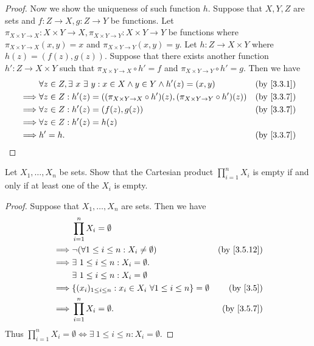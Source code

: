 \begin{proof}
  Now we show the uniqueness of such function \(h\).
  Suppose that \(X, Y, Z\) are sets and \(f : Z \to X, g : Z \to Y\) be functions.
  Let \(\pi_{X \times Y \to X} : X \times Y \to X, \pi_{X \times Y \to Y} : X \times Y \to Y\) be functions where \(\pi_{X \times Y \to X}(x, y) = x\) and \(\pi_{X \times Y \to Y}(x, y) = y\).
  Let \(h : Z \to X \times Y\) where \(h(z) = (f(z), g(z))\).
  Suppose that there exists another function \(h' : Z \to X \times Y\) such that \(\pi_{X \times Y \to X} \circ h' = f\) and \(\pi_{X \times Y \to Y} \circ h' = g\).
  Then we have
  \begin{align*}
             & \forall z \in Z, \exists\ x \ \exists\ y : x \in X \land y \in Y \land h'(z) = (x, y)                  & \text{(by \cref{3.3.1})} \\
    \implies & \forall z \in Z : h'(z) = ((\pi_{X \times Y \to X} \circ h')(z), (\pi_{X \times Y \to Y} \circ h')(z)) & \text{(by \cref{3.3.7})} \\
    \implies & \forall z \in Z : h'(z) = (f(z), g(z))                                                                 & \text{(by \cref{3.3.7})} \\
    \implies & \forall z \in Z : h'(z) = h(z)                                                                                                    \\
    \implies & h' = h.                                                                                                & \text{(by \cref{3.3.7})}
  \end{align*}
\end{proof}

\begin{ex}\label{ex:3.5.8}
  Let \(X_1, \dots, X_n\) be sets.
  Show that the Cartesian product \(\prod_{i = 1}^n X_i\) is empty if and only if at least one of the \(X_i\) is empty.
\end{ex}

\begin{proof}
  Suppose that \(X_1, \dots, X_n\) are sets.
  Then we have
  \begin{align*}
             & \prod_{i = 1}^n X_i = \emptyset                                                                             \\
    \implies & \lnot (\forall 1 \leq i \leq n : X_i \neq \emptyset)                            & \text{(by \cref{3.5.12})} \\
    \implies & \exists\ 1 \leq i \leq n : X_i = \emptyset.                                                                 \\
             & \exists\ 1 \leq i \leq n : X_i = \emptyset                                                                  \\
    \implies & \{(x_i)_{1 \leq i \leq n} : x_i \in X_i \ \forall 1 \leq i \leq n\} = \emptyset & \text{(by \cref{3.5})}    \\
    \implies & \prod_{i = 1}^n X_i = \emptyset.                                                & \text{(by \cref{3.5.7})}
  \end{align*}
  Thus \(\prod_{i = 1}^n X_i = \emptyset \iff \exists\ 1 \leq i \leq n : X_i = \emptyset\).
\end{proof}

